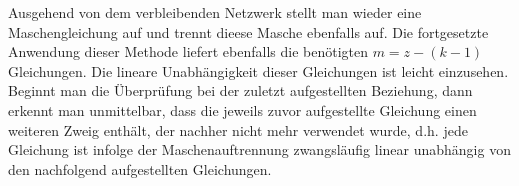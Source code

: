 \noindent Ausgehend von dem verbleibenden Netzwerk stellt man wieder eine Maschengleichung auf und trennt dieese Masche ebenfalls auf. Die fortgesetzte Anwendung dieser Methode liefert ebenfalls die benötigten $m=z-\left(k-1\right)$ Gleichungen. Die lineare Unabhängigkeit dieser Gleichungen ist leicht einzusehen. Beginnt man die Überprüfung bei der zuletzt aufgestellten Beziehung, dann erkennt man unmittelbar, dass die jeweils zuvor aufgestellte Gleichung einen weiteren Zweig enthält, der nachher nicht mehr verwendet wurde, d.h. jede Gleichung ist infolge der Maschenauftrennung zwangsläufig linear unabhängig von den nachfolgend aufgestellten Gleichungen.